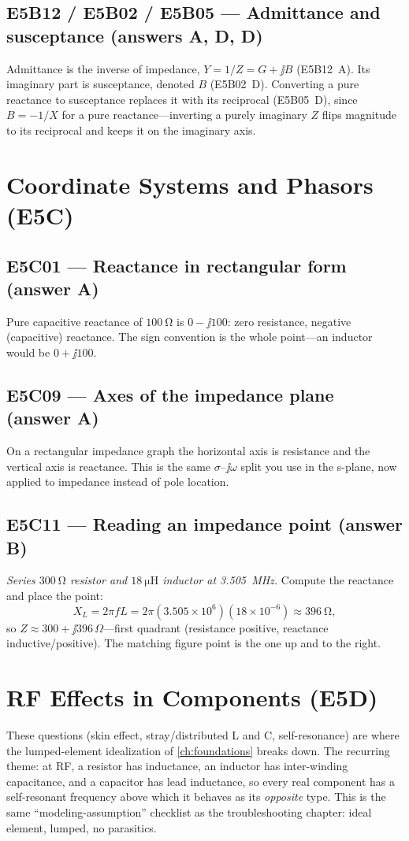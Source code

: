 \subsection*{E5B12 / E5B02 / E5B05 --- Admittance and susceptance (answers A, D, D)}
Admittance is the inverse of impedance, \(Y=1/Z=G+\jj B\) (E5B12~A). Its imaginary
part is susceptance, denoted \(B\) (E5B02~D). Converting a pure reactance to
susceptance replaces it with its reciprocal (E5B05~D), since \(B=-1/X\) for a pure
reactance---inverting a purely imaginary \(Z\) flips magnitude to its reciprocal
and keeps it on the imaginary axis.

\section{Coordinate Systems and Phasors (E5C)}

\subsection*{E5C01 --- Reactance in rectangular form (answer A)}
Pure capacitive reactance of \(\SI{100}{\ohm}\) is \(0-\jj100\): zero resistance,
negative (capacitive) reactance. The sign convention is the whole point---an
inductor would be \(0+\jj100\).

\subsection*{E5C09 --- Axes of the impedance plane (answer A)}
On a rectangular impedance graph the horizontal axis is resistance and the
vertical axis is reactance. This is the same \(\sigma\)--\(\jj\omega\) split you
use in the s-plane, now applied to impedance instead of pole location.

\subsection*{E5C11 --- Reading an impedance point (answer B)}
\emph{Series \(\SI{300}{\ohm}\) resistor and \(\SI{18}{\micro\henry}\) inductor at
\SI{3.505}{\mega\hertz}.} Compute the reactance and place the point:
\[
X_L=2\pi f L=2\pi(3.505\times10^6)(18\times10^{-6})\approx\SI{396}{\ohm},
\]
so \(Z\approx300+\jj396\,\Omega\)---first quadrant (resistance positive, reactance
inductive/positive). The matching figure point is the one up and to the right.

\section{RF Effects in Components (E5D)}
These questions (skin effect, stray/distributed L and C, self-resonance) are
where the lumped-element idealization of \cref{ch:foundations} breaks down. The
recurring theme: at RF, a resistor has inductance, an inductor has
inter-winding capacitance, and a capacitor has lead inductance, so every real
component has a self-resonant frequency above which it behaves as its
\emph{opposite} type. This is the same ``modeling-assumption'' checklist as the
troubleshooting chapter: ideal element, lumped, no parasitics.

